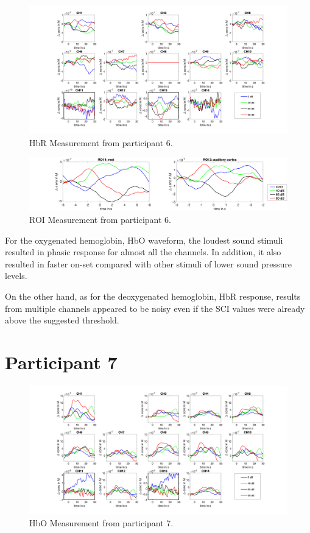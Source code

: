 \begin{figure}[H]
  \centering
    \includegraphics[scale=.4]{bilder/HbR_Mole/sub_shelia_s_HbR.png}
  \caption{HbR Measurement from participant 6.}
  \label{fig:somesignal}
\end{figure}

\begin{figure}[H]
  \centering
    \includegraphics[scale=.29]{bilder/ROI/sub_shelia_s_HbO.png}
  \caption{ROI Measurement from participant  6.}
\end{figure}

For the oxygenated hemoglobin, \acrshort{HbO} waveform, the loudest sound stimuli resulted in phasic response for almost all the channels. In addition, it also resulted in faster on-set compared with other stimuli of lower sound pressure levels.

On the other hand, as for the deoxygenated hemoglobin, \acrshort{HbR} response, results from multiple channels appeared to be noisy even if the SCI values were already above the suggested threshold.

\newpage





\section {Participant 7}
\begin{figure}[H]
  \centering
    \includegraphics[scale=.4]{bilder/HbO_Mole/sub_liao_s_HbO.png}
  \caption{HbO Measurement from participant 7.}
  \label{fig:somesignal}
\end{figure}

